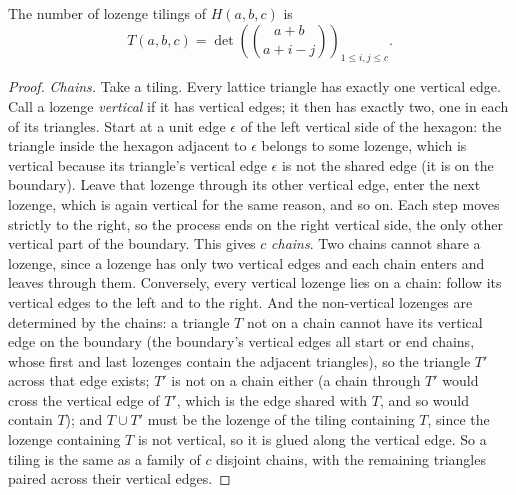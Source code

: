 \begin{theorem}\label{linear:thm:lozenge}
The number of lozenge tilings of $H(a,b,c)$ is
\[
T(a,b,c)=\det\left(\binom{a+b}{a+i-j}\right)_{1\le i,j\le c}.
\]
\end{theorem}
\begin{proof}
\emph{Chains.} Take a tiling. Every lattice triangle has exactly one vertical edge. Call a lozenge \emph{vertical} if
it has vertical edges; it then has exactly two, one in each of its triangles. Start at a unit edge $\epsilon$ of the left
vertical side of the hexagon: the triangle inside the hexagon adjacent to $\epsilon$ belongs to some lozenge, which is
vertical because its triangle's vertical edge $\epsilon$ is not the shared edge (it is on the boundary). Leave that
lozenge through its other vertical edge, enter the next lozenge, which is again vertical for the same reason, and so on.
Each step moves strictly to the right, so the process ends on the right vertical side, the only other vertical part of
the boundary. This gives $c$ \emph{chains}. Two chains cannot share a lozenge, since a lozenge has only two vertical
edges and each chain enters and leaves through them. Conversely, every vertical lozenge lies on a chain: follow its
vertical edges to the left and to the right. And the non-vertical lozenges are determined by the chains: a triangle
$T$ not on a chain cannot have its vertical edge on the boundary (the boundary's vertical edges all start or end chains,
whose first and last lozenges contain the adjacent triangles), so the triangle $T'$ across that edge exists; $T'$ is not on a
chain either (a chain through $T'$ would cross the vertical edge of $T'$, which is the edge shared with $T$, and so would
contain $T$); and $T\cup T'$ must be the lozenge of the tiling containing $T$, since the lozenge containing $T$ is not
vertical, so it is glued along the vertical edge. So a tiling is the same as a family of $c$ disjoint chains, with the
remaining triangles paired across their vertical edges.


\end{proof}
